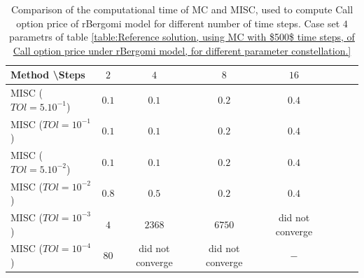 \documentclass[11pt]{article}
\begin{document}
\begin{table}[h!]
	\centering
	\begin{tabular}{l*{6}{c}r}
		Method \textbackslash  Steps            & $2$ & $4$ & $8$ & $16$ &   \\
		\hline
		MISC ($TOl=5.10^{-1}$)  & $0.1$ & $0.1$ & $0.2$ & $0.4$  \\
		MISC ($TOl=10^{-1}$)  & $0.1$ & $0.1$ & $0.2$ & $0.4$\\
		MISC ($TOl=5.10^{-2}$)  & $0.1$ & $0.1$ & $0.2$ & $0.4$ \\
		MISC ($TOl=10^{-2}$)  & $0.8$ & $0.5$ & $0.2$ & $0.4$  \\
		MISC ($TOl=10^{-3}$)  & $4$ & $2368$ & $6750$ & did not converge  \\
		MISC ($TOl=10^{-4}$)  & $80$ & did not converge & did not converge & $-$  \\
		\hline
	\end{tabular}
	\caption{Comparison of the computational time of  MC and MISC, used to compute Call option price of rBergomi model for different number of time steps. Case set $4$ parametrs of table \ref{table:Reference solution, using MC with $500$ time steps, of Call option price under rBergomi model, for different parameter constellation.} }
	\label{Comparsion of the computational time of  MC and MISC, used to compute Call option price of rBergomi model for different number of time steps. Case set4}
\end{table}
\end{document}
